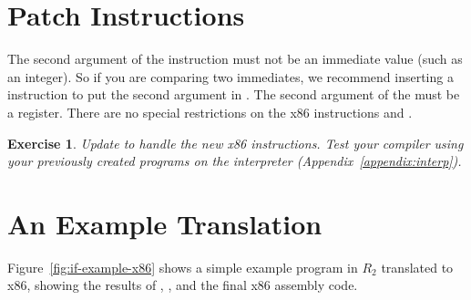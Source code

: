 \documentclass[11pt]{book}
\newtheorem{exercise}[theorem]{Exercise}
\begin{document}


\section{Patch Instructions}

The second argument of the  instruction must not be an
immediate value (such as an integer). So if you are comparing two
immediates, we recommend inserting a  instruction to put the
second argument in .
%
The second argument of the  must be a register.
%
There are no special restrictions on the x86 instructions 
and .

\begin{exercise}\normalfont
Update  to handle the new x86 instructions.
Test your compiler using your previously created programs on the
 interpreter (Appendix~\ref{appendix:interp}).
\end{exercise}


\section{An Example Translation}

Figure~\ref{fig:if-example-x86} shows a simple example program in
$R_2$ translated to x86, showing the results of
, , and the final
x86 assembly code.
\end{document}
